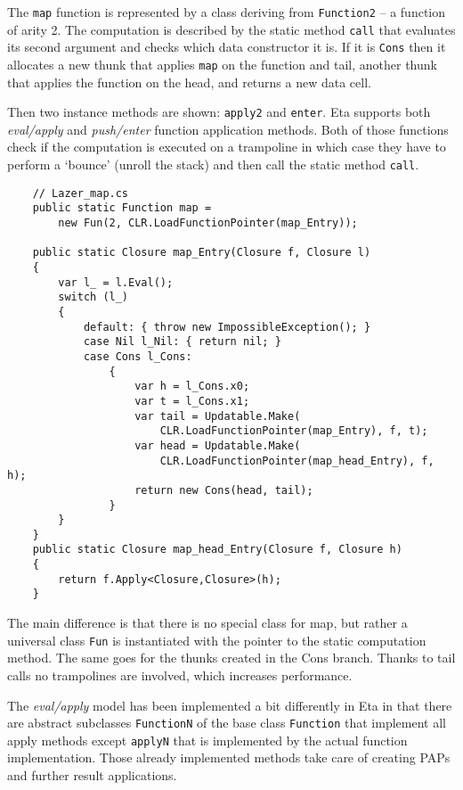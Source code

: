 \documentclass[en]{pracamgr}
\begin{document}
The \texttt{map} function is represented by a class deriving
from \texttt{Function2} -- a function of arity 2.
The computation is described by the static method \texttt{call}
that evaluates its second argument and checks which data
constructor it is. If it is \texttt{Cons} then it
allocates a new thunk that applies \texttt{map} on the function and tail, another thunk that applies the
function on the head, and returns a new data cell.

Then two instance methods are shown: \texttt{apply2} and \texttt{enter}.
Eta supports both \textit{eval/apply} and \textit{push/enter}
function application methods.
Both of those functions check if the computation is
executed on a trampoline in which case they have to
perform a `bounce' (unroll the stack)
and then call the static method \texttt{call}.

\begin{verbatim}
    // Lazer_map.cs
    public static Function map = 
        new Fun(2, CLR.LoadFunctionPointer(map_Entry));

    public static Closure map_Entry(Closure f, Closure l)
    {
        var l_ = l.Eval();
        switch (l_)
        {
            default: { throw new ImpossibleException(); }
            case Nil l_Nil: { return nil; }
            case Cons l_Cons:
                {
                    var h = l_Cons.x0;
                    var t = l_Cons.x1;
                    var tail = Updatable.Make(
                        CLR.LoadFunctionPointer(map_Entry), f, t);
                    var head = Updatable.Make(
                        CLR.LoadFunctionPointer(map_head_Entry), f, h);
                    return new Cons(head, tail);
                }
        }
    }
    public static Closure map_head_Entry(Closure f, Closure h)
    {
        return f.Apply<Closure,Closure>(h);
    }
\end{verbatim}

The main difference is that there is no special class for map,
but rather a universal class \texttt{Fun} is instantiated
with the pointer to the static computation method.
The same goes for the thunks created in the Cons branch.
Thanks to tail calls no trampolines are involved, which
increases performance.

The \textit{eval/apply} model has been implemented a bit differently
in Eta in that there are abstract subclasses \texttt{FunctionN}
of the base class \texttt{Function} that implement all
apply methods except \texttt{applyN} that is implemented
by the actual function implementation.
Those already implemented methods take care of creating
PAPs and further result applications.
\end{document}
